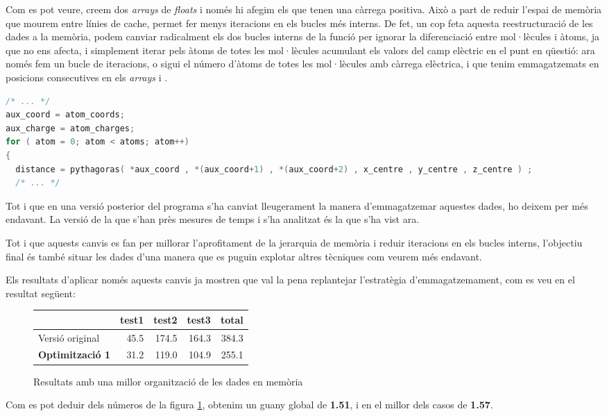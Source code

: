 Com es pot veure, creem dos \emph{arrays} de \emph{floats} i només hi afegim els que tenen una càrrega positiva. Això a part de reduir l'espai de memòria que mourem entre línies de cache, permet fer menys iteracions en els bucles més interns. De fet, un cop feta aquesta reestructuració de les dades a la memòria, podem canviar radicalment els dos bucles interns de la funció per ignorar la diferenciació entre mol·lècules i àtoms, ja que no ens afecta, i simplement iterar pels àtoms de totes les mol·lècules acumulant els valors del camp elèctric en el punt en qüestió: ara només fem un bucle de  iteracions, o sigui el número d'àtoms de totes les mol·lècules amb càrrega elèctrica, i que tenim emmagatzemats en posicions consecutives en els \emph{arrays}  i .

\begin{lstlisting}[label=mem2, caption=Bucle intern que substitueix els anteriors 2 bucles més interns, language=C]
/* ... */
aux_coord = atom_coords;
aux_charge = atom_charges;
for ( atom = 0; atom < atoms; atom++)
{
  distance = pythagoras( *aux_coord , *(aux_coord+1) , *(aux_coord+2) , x_centre , y_centre , z_centre ) ;
  /* ... */
\end{lstlisting}

Tot i que en una versió posterior del programa s'ha canviat lleugerament la manera d'emmagatzemar aquestes dades, ho deixem per més endavant. La versió de la que s'han près mesures de temps i s'ha analitzat és la que s'ha vist ara.

Tot i que aquests canvis es fan per millorar l'aprofitament de la jerarquia de memòria i reduir iteracions en els bucles interns, l'objectiu final és també situar les dades d'una manera que es puguin explotar altres tècniques com veurem més endavant.

Els resultats d'aplicar només aquests canvis ja mostren que val la pena replantejar l'estratègia d'emmagatzemament, com es veu en el resultat següent:

\begin{figure}[ht]
  \caption{Resultats amb una millor organització de les dades en memòria}\label{fig:elapsed_1}
  \begin{center}
    \begin{tabular}{ l r r r r }
      & test1 & test2 & test3 & total \\
      \hline
      Versió original & 45.5 & 174.5 & 164.3 & 384.3 \\
      \textbf{Optimització 1} & 31.2 & 119.0 & 104.9 & 255.1 \\
    \end{tabular}
  \end{center}
\end{figure}

Com es pot deduir dels números de la figura \ref{fig:elapsed_1}, obtenim un guany global de \textbf{1.51}, i en el millor dels casos de \textbf{1.57}.

